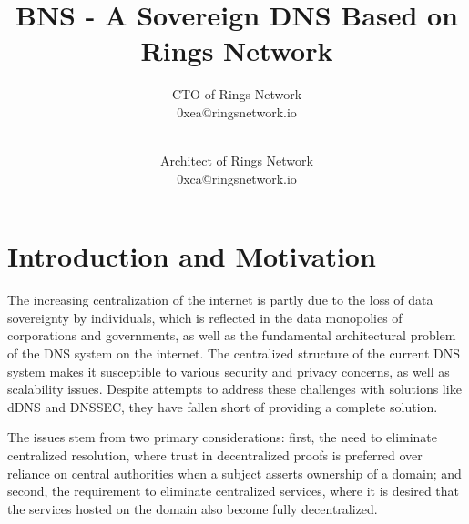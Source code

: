 \documentclass[twocolumn]{article}
\author{
  CTO of Rings Network \\ 0xea@ringsnetwork.io \\ \\
  \and
  Architect of Rings Network \\ 0xca@ringsnetwork.io
}
\title{BNS - A Sovereign DNS Based on Rings Network}
\begin{document}

\section{Introduction and Motivation}
The increasing centralization of the internet is partly due to the loss of data sovereignty\cite{si} by individuals, which is reflected in the data monopolies of corporations and governments, as well as the fundamental architectural problem of the DNS system on the internet. The centralized structure of the current DNS system makes it susceptible to various security and privacy concerns, as well as scalability issues. Despite attempts to address these challenges with solutions like dDNS and DNSSEC, they have fallen short of providing a complete solution.


The issues stem from two primary considerations: first, the need to eliminate centralized resolution, where trust in decentralized proofs is preferred over reliance on central authorities when a subject asserts ownership of a domain; and second, the requirement to eliminate centralized services, where it is desired that the services hosted on the domain also become fully decentralized.
\end{document}
